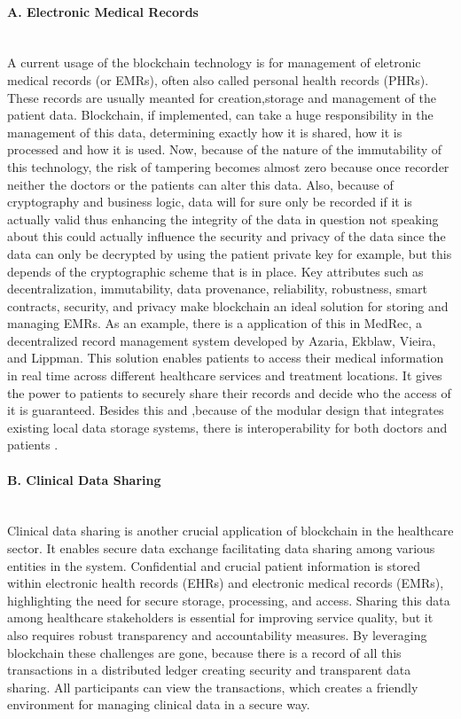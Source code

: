 \paragraph{A. Electronic Medical Records} \mbox{}\\
A current usage of the blockchain technology is for management of eletronic medical records (or EMRs), often also called personal health records (PHRs). These records are usually meanted for creation,storage and management of the patient data. Blockchain, if implemented, can take a huge responsibility in the management of this data, determining exactly how it is shared, how it is processed and how it is used. Now, because of the nature of the immutability of this technology, the risk of tampering becomes almost zero because once recorder neither the doctors or the patients can alter this data. Also, because of cryptography and business logic, data will for sure only be recorded if it is actually valid thus enhancing the integrity of the data in question not speaking about this could actually influence the security and privacy of the data since the data can only be decrypted by using the patient private key for example, but this depends of the cryptographic scheme that is in place. Key attributes such as decentralization, immutability, data provenance, reliability, robustness, smart contracts, security, and privacy make blockchain an ideal solution for storing and managing EMRs. As an example, there is a application of this in MedRec, a decentralized record management system developed by Azaria, Ekblaw, Vieira, and Lippman. This solution enables patients to access their medical information in real time across different healthcare services and treatment locations. It gives the power to patients to securely share their records and decide who the access of it is guaranteed. Besides this and ,because of the modular design that integrates existing local data storage systems, there is interoperability for both doctors and patients \cite{apps-block-healthcare}.

\paragraph{B. Clinical Data Sharing} \mbox{}\\
Clinical data sharing is another crucial application of blockchain in the healthcare sector. It enables secure data exchange facilitating data sharing among various entities in the system. Confidential and crucial patient information is stored within electronic health records (EHRs) and electronic medical records (EMRs), highlighting the need for secure storage, processing, and access. Sharing this data among healthcare stakeholders is essential for improving service quality, but it also requires robust transparency and accountability measures.
By leveraging blockchain these challenges are gone, because there is a record of all this transactions in a distributed ledger creating security and transparent data sharing. All participants can view the transactions, which creates a friendly environment for managing clinical data in a secure way.

